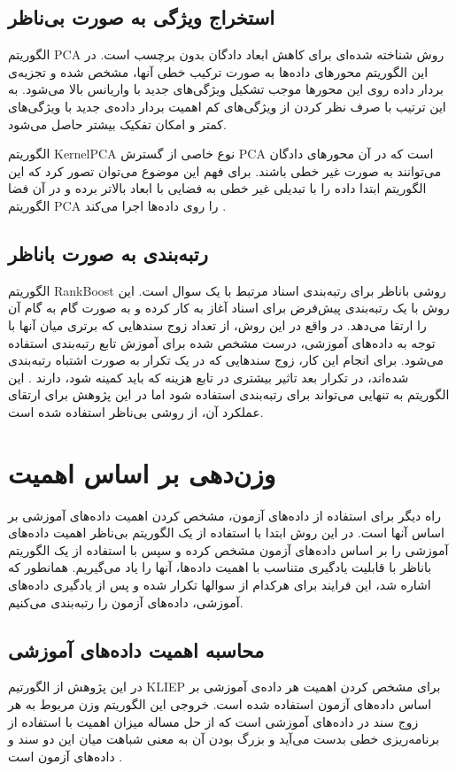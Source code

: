 \documentclass{article}
\begin{document}
\subsection{استخراج ویژگی به صورت بی‌ناظر}
الگوریتم PCA روش شناخته شده‌ای برای کاهش ابعاد دادگان بدون برچسب است. در این الگوریتم محورهای داده‌ها به صورت ترکیب خطی آنها، مشخص شده و تجزیه‌ی بردار داده روی این محورها موجب تشکیل ویژگی‌های جدید با واریانس بالا می‌شود. به این ترتیب با صرف نظر کردن از ویژگی‌های کم اهمیت بردار داده‌ی جدید با ویژگی‌های کمتر و امکان تفکیک بیشتر حاصل می‌شود.

الگوریتم KernelPCA نوع خاصی از گسترش PCA است که در آن محورهای دادگان می‌توانند به صورت غیر خطی باشند. برای فهم این موضوع می‌توان تصور کرد که این الگوریتم ابتدا داده را با تبدیلی غیر خطی به فضایی با ابعاد بالاتر برده و در آن فضا الگوریتم PCA را روی داده‌ها اجرا می‌کند \cite{kernelpca}.

\subsection{رتبه‌بندی به صورت باناظر}
الگوریتم RankBoost روشی باناظر برای رتبه‌بندی اسناد مرتبط با یک سوال است. این روش با یک رتبه‌بندی پیش‌فرض برای اسناد آغاز به کار کرده و به صورت گام به گام آن را ارتقا می‌دهد. در واقع در این روش، از تعداد زوج سندهایی که برتری میان آنها با توجه به داده‌های آموزشی، درست مشخص شده برای آموزش تابع رتبه‌بندی استفاده می‌شود. برای انجام این کار، زوج سندهایی که در یک تکرار به صورت اشتباه رتبه‌بندی شده‌اند، در تکرار بعد تاثیر بیشتری در تابع هزینه که باید کمینه شود، دارند \cite{rankboost}. این الگوریتم به تنهایی می‌تواند برای رتبه‌بندی استفاده شود اما در این پژوهش برای ارتقای عملکرد آن، از روشی بی‌ناظر استفاده شده است.

\section{وزن‌دهی بر اساس اهمیت}
راه دیگر برای استفاده از داده‌های آزمون، مشخص کردن اهمیت داده‌های آموزشی بر اساس آنها است. در این روش ابتدا با استفاده از یک الگوریتم بی‌ناظر اهمیت داده‌های آموزشی را بر اساس داده‌های آزمون مشخص کرده و سپس با استفاده از یک الگوریتم باناظر با قابلیت یادگیری متناسب با اهمیت داده‌ها، آنها را یاد می‌گیریم. همانطور که اشاره شد، این فرایند برای هرکدام از سوالها تکرار شده و پس از یادگیری داده‌های آموزشی، داده‌های آزمون را رتبه‌بندی می‌کنیم.

 \subsection{محاسبه اهمیت داده‌های آموزشی}
در این پژوهش از الگورتیم KLIEP برای مشخص کردن اهمیت هر داده‌ی آموزشی بر اساس داده‌های آزمون استفاده شده است. خروجی این الگوریتم وزن مربوط به هر زوج سند در داده‌های آموزشی است که از حل مساله میزان اهمیت با استفاده از برنامه‌ریزی خطی بدست می‌آید و بزرگ بودن آن به معنی شباهت میان این دو سند و داده‌های آزمون است \cite{kliep}. 
\end{document}
